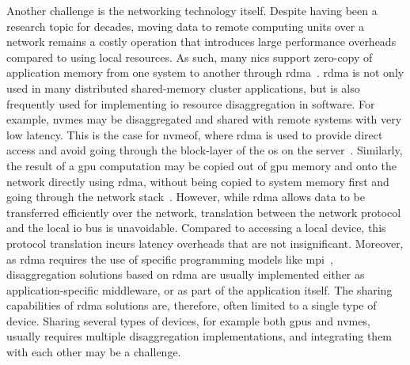 Another challenge is the networking technology itself. 
%
Despite having been a research topic for decades, moving data to remote computing units over a network remains a costly operation that introduces large performance overheads compared to using local resources.
%
As such, many \glspl{nic} support zero-copy of application memory from one system to another through \gls{rdma}~\cite{Huang2012}.
%
\Gls{rdma} is not only used in many distributed shared-memory cluster applications, but is also frequently used for implementing \gls{io} resource \gls{disaggregation} in software.
%
For example, \glspl{nvme} may be \gls{disaggregated} and shared with remote systems with very low latency.
This is the case for \gls{nvmeof}, where \gls{rdma} is used to provide direct access and avoid going through the block-layer of the \gls{os} on the server~\cite{Guz2018}.
%
Similarly, the result of a \gls{gpu} computation may be copied out of \gls{gpu} memory and onto the network directly using \gls{rdma}, without being copied to system memory first and going through the network stack~\cite{Venkatesh2014}.
%
However, while \gls{rdma} allows data to be transferred efficiently over the network, translation between the network protocol and the local \gls{io} bus is unavoidable. 
%
Compared to accessing a local device, this protocol translation incurs latency overheads that are not insignificant.
%
Moreover, as \gls{rdma} requires the use of specific programming models like \gls{mpi}~\cite{Jiang2004}, \gls{disaggregation} solutions based on \gls{rdma} are usually implemented either as application-specific \gls{middleware}, or as part of the application itself.
%
The sharing capabilities of \gls{rdma} solutions are, therefore, often limited to a single type of device.
Sharing several types of devices, for example both \glspl{gpu} and \glspl{nvme}, usually requires multiple \gls{disaggregation} implementations, and integrating them with each other may be a challenge.



